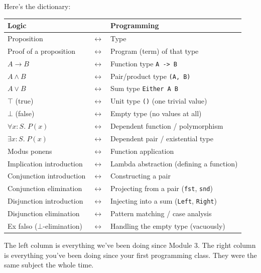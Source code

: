 \documentclass[11pt]{article}
\begin{document}
Here's the dictionary:

\begin{center}
\begin{tabular}{lll}
\toprule
\textbf{Logic} & & \textbf{Programming} \\
\midrule
Proposition & $\longleftrightarrow$ & Type \\
Proof of a proposition & $\longleftrightarrow$ & Program (term) of that type \\
$A \to B$ & $\longleftrightarrow$ & Function type \texttt{A -> B} \\
$A \wedge B$ & $\longleftrightarrow$ & Pair/product type \texttt{(A, B)} \\
$A \vee B$ & $\longleftrightarrow$ & Sum type \texttt{Either A B} \\
$\top$ (true) & $\longleftrightarrow$ & Unit type \texttt{()} (one trivial value) \\
$\bot$ (false) & $\longleftrightarrow$ & Empty type (no values at all) \\
$\forall x : S.\; P(x)$ & $\longleftrightarrow$ & Dependent function / polymorphism \\
$\exists x : S.\; P(x)$ & $\longleftrightarrow$ & Dependent pair / existential type \\
\midrule
Modus ponens & $\longleftrightarrow$ & Function application \\
Implication introduction & $\longleftrightarrow$ & Lambda abstraction (defining a function) \\
Conjunction introduction & $\longleftrightarrow$ & Constructing a pair \\
Conjunction elimination & $\longleftrightarrow$ & Projecting from a pair (\texttt{fst}, \texttt{snd}) \\
Disjunction introduction & $\longleftrightarrow$ & Injecting into a sum (\texttt{Left}, \texttt{Right}) \\
Disjunction elimination & $\longleftrightarrow$ & Pattern matching / case analysis \\
Ex falso ($\bot$-elimination) & $\longleftrightarrow$ & Handling the empty type (vacuously) \\
\bottomrule
\end{tabular}
\end{center}

The left column is everything we've been doing since Module 3. The right column is everything you've been doing since your first programming class. They were the same subject the whole time.
\end{document}
